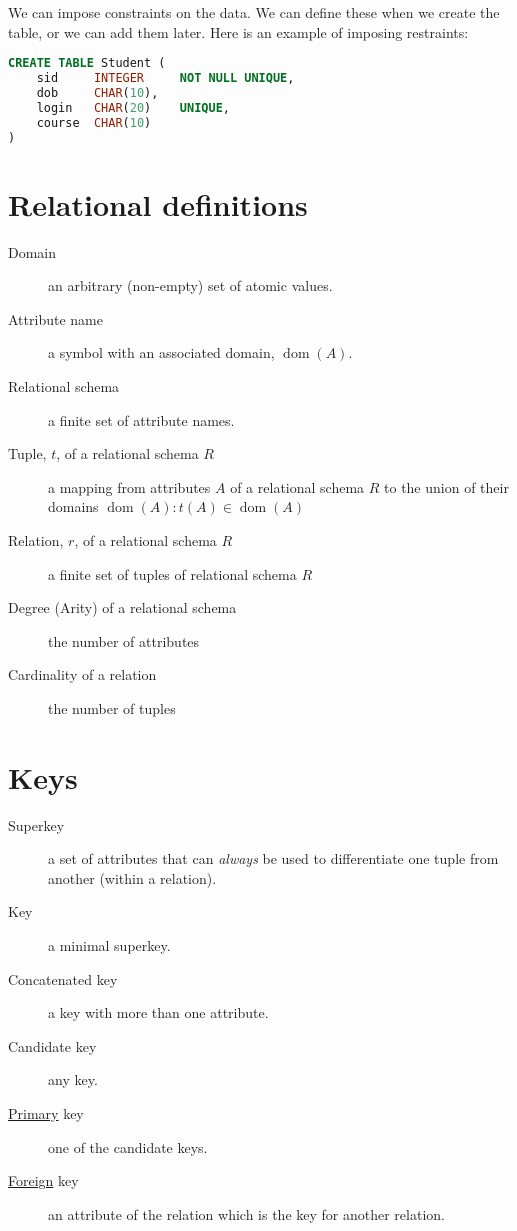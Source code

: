 We can impose constraints on the data. We can define these when we create the table, or we can add them later. Here is an example of imposing restraints:

\begin{lstlisting}[tabsize=3, language=sql]
CREATE TABLE Student (
	sid		INTEGER 	NOT NULL UNIQUE,
	dob		CHAR(10),
	login 	CHAR(20)	UNIQUE,
	course	CHAR(10)
)
\end{lstlisting}

\section{Relational definitions}
\begin{description}
	\item[Domain] an arbitrary (non-empty) set of atomic values.
	\item[Attribute name] a symbol with an associated domain, \(\operatorname{dom}(A)\).
	\item[Relational schema] a finite set of attribute names.
	\item[Tuple, \(t\), of a relational schema \(R\)] a mapping from attributes \(A\) of a relational schema \(R\) to the union of their domains \(\operatorname{dom}(A) : t(A) \in \operatorname{dom}(A)\)
	\item[Relation, \(r\), of a relational schema \(R\)] a finite set of tuples of relational s\-che\-ma \(R\)
	\item[Degree (Arity) of a relational schema] the number of attributes
	\item[Cardinality of a relation] the number of tuples
\end{description}

\section{Keys}
\begin{description}
	\item[Superkey] a set of attributes that can \textit{always} be used to differentiate one tuple from another (within a relation).
	\item[Key] a minimal superkey.
	\item[Concatenated key] a key with more than one attribute.
	\item[Candidate key] any key.
	\item[\underline{Primary} key] one of the candidate keys.
	\item[\underline{Foreign} key] an attribute of the relation which is the key for another relation.
\end{description}
















